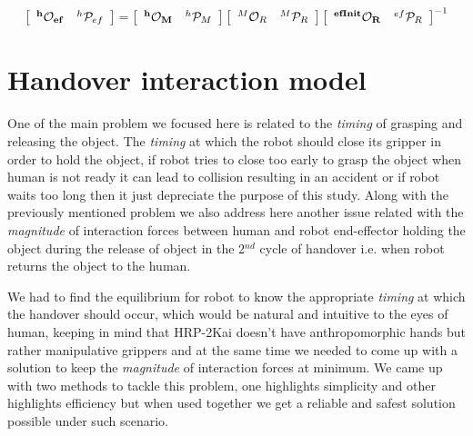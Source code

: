 \begin{gather}\label{X_efinit_hori}
\left[\begin{array}{cc}
\bf{{}^{h}\mathcal{O}_{ef}} & {}^{h}\mathcal{P}_{ef}
\end{array}\right] =
\left[\begin{array}{cc}
\bf{{}^{h}\mathcal{O}_M} & {}^{h}\mathcal{P}_M
\end{array}\right]
\left[\begin{array}{cc}
{}^{M}\mathcal{O}_R & {}^{M}\mathcal{P}_R
\end{array}\right]
\left[\begin{array}{cc}
\bf{{}^{efInit}\mathcal{O}_{R}} & {}^{ef}\mathcal{P}_{R}
\end{array}\right]^{-1}
\end{gather}



\clearpage

\section{Handover interaction model}\label{interaction model}

One of the main problem we focused here is related to the \textit{timing} of grasping and releasing the object. The \textit{timing} at which the robot should close its gripper in order to hold the object, if robot tries to close too early to grasp the object when human is not ready it can lead to collision resulting in an accident or if robot waits too long then it just depreciate the purpose of this study. Along with the previously mentioned problem we also address here another issue related with the \textit{magnitude} of interaction forces between human and robot end-effector holding the object during the release of object in the 2$^{nd}$ cycle of handover i.e. when robot returns the object to the human.


We had to find the equilibrium for robot to know the appropriate \textit{timing} at which the handover should occur, which would be natural and intuitive to the eyes of human, keeping in mind that HRP-2Kai doesn't have anthropomorphic hands but rather manipulative grippers and at the same time we needed to come up with a solution to keep the \textit{magnitude} of interaction forces at minimum. We came up with two methods to tackle this problem, one highlights simplicity and other highlights efficiency but when used together we get a reliable and safest solution possible under such scenario.



